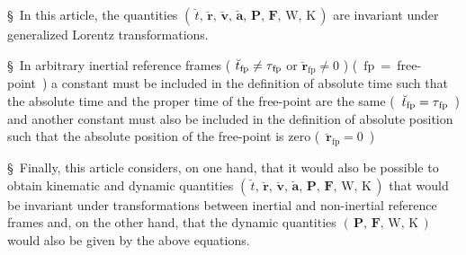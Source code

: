 \documentclass[10pt,fleqn]{article}
\begin{document}
\vspace{+0.60em}

\par {}

\bigskip \smallskip

\noindent \S \ In this article, the quantities $( \, \breve{t}, \, \breve{\mathbf{r}}, \, \breve{\mathbf{v}}, \, \breve{\mathbf{a}}, \, \mathbf{P}, \, \mathbf{F}, \, \mathrm{W}, \, \mathrm{K} \, )$ are invariant under generalized Lorentz transformations.
\par \bigskip \smallskip
\noindent \S \ In arbitrary inertial reference frames ( $\breve{t}_{\mathrm{fp}} \ne \tau_{\mathrm{\hspace{+0.06em}fp}}$ or $\breve{\mathbf{r}}_{\mathrm{fp}} \ne 0$ ) \hbox {( ${\mathrm{fp}}$ = free-point )} a constant must be included in the definition of absolute time such that the \hbox {absolute} time and the proper time of the free-point are the same \hbox {( $\breve{t}_{\mathrm{fp}} = \tau_{\mathrm{\hspace{+0.06em}fp}}$ )} and another constant must also be included in the definition of absolute position such that the absolute position of the free-point is zero \hbox {( $\breve{\mathbf{r}}_{\mathrm{fp}} = 0$ )}
\par \bigskip \smallskip
\noindent \S \ Finally, this article considers, on one hand, that it would also be possible to obtain kinematic and dynamic quantities $( \, \breve{t}, \, \breve{\mathbf{r}}, \, \breve{\mathbf{v}}, \, \breve{\mathbf{a}}, \, \mathbf{P}, \, \mathbf{F}, \, \mathrm{W}, \, \mathrm{K} \, )$ that would be invariant under transformations between inertial and non-inertial reference frames and, on the other hand, that the dynamic quantities $( \, \mathbf{P}, \, \mathbf{F}, \, \mathrm{W}, \, \mathrm{K} \, )$ would also be given by the above equations.

\newpage

\par {}

\smallskip

\par {}
\end{document}
